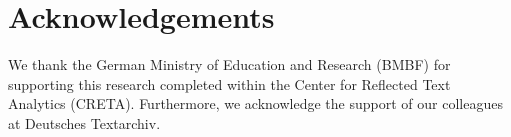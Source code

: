 \documentclass[11pt,letterpaper]{article}
\begin{document}
\section{Acknowledgements}
We thank the German Ministry of Education and Research (BMBF)  for supporting this research completed within the Center for Reflected Text Analytics (CRETA). Furthermore, we acknowledge the support of our colleagues at Deutsches Textarchiv.




\end{document}
